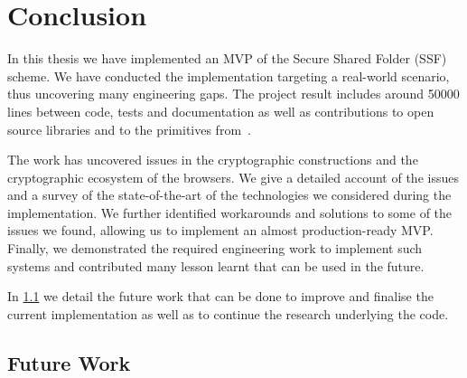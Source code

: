 \chapter{Conclusion}\label{ch:conclusion}

In this thesis we have implemented an MVP of the
Secure Shared Folder (SSF) scheme. We have conducted
the implementation targeting a real-world scenario,
thus uncovering many engineering gaps.
The project result includes around 50000 lines
between code, tests and documentation as well as
contributions to open source libraries and to the
primitives from~\cite{GKP}.

The work has uncovered issues in the cryptographic constructions
and the cryptographic ecosystem of the browsers.
We give a detailed account of the issues and a survey
of the state-of-the-art of the technologies
we considered during the implementation.
We further identified workarounds and solutions
to some of the issues we found, 
allowing us to implement an almost production-ready MVP.
Finally, we demonstrated the required engineering work 
to implement such systems and contributed many lesson learnt
that can be used in the future.


In \cref{sc:future-work} we detail
the future work that can be done to improve and finalise
the current implementation as well as to continue 
the research underlying the code.


\section{Future Work}\label{sc:future-work}

